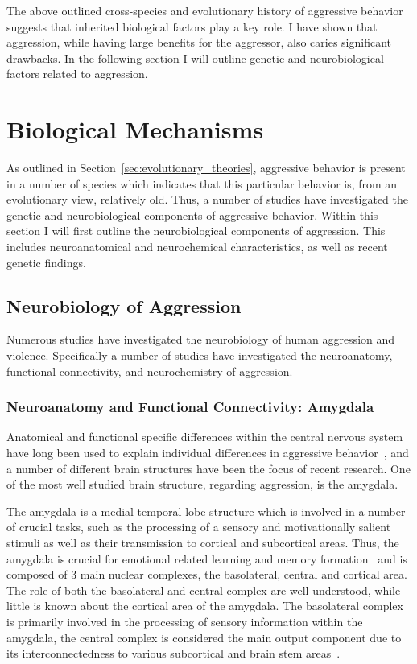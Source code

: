 The above outlined cross-species and evolutionary history of aggressive behavior suggests that inherited biological factors play a key role.
I have shown that aggression, while having large benefits for the aggressor, also caries significant drawbacks.
In the following section I will outline genetic and neurobiological factors related to aggression.

\section{Biological Mechanisms}
\label{sec:biological_mechanisms}

As outlined in Section~\ref{sec:evolutionary_theories}, aggressive behavior is present in a number of species which indicates that this particular behavior is, from an evolutionary view, relatively old.
Thus, a number of studies have investigated the genetic and neurobiological components of aggressive behavior.
Within this section I will first outline the neurobiological components of aggression.
This includes neuroanatomical and neurochemical characteristics, as well as recent genetic findings. 

\subsection{Neurobiology of Aggression}
\label{sub:neurobiology_of_aggression}

Numerous studies have investigated the neurobiology of human aggression and violence.
Specifically a number of studies have investigated the neuroanatomy, functional connectivity, and neurochemistry of aggression. 

\subsubsection{Neuroanatomy and Functional Connectivity: Amygdala}
\label{ssub:neuroanatomy_and_functional_conectivity}

Anatomical and functional specific differences within the central nervous system have long been used to explain individual differences in aggressive behavior~\citet{Rosell2015}, and a number of different brain structures have been the focus of recent research.
One of the most well studied brain structure, regarding aggression, is the amygdala.

The amygdala is a medial temporal lobe structure which is involved in a number of crucial tasks, such as the processing of a sensory and motivationally salient stimuli as well as their transmission to cortical and subcortical areas.
Thus, the amygdala is crucial for emotional related learning and memory formation~\cite{Salzman2010} and is composed of 3 main nuclear complexes, the basolateral, central and cortical area.
The role of both the basolateral and central complex are well understood, while little is known about the cortical area of the amygdala.
The basolateral complex is primarily involved in the processing of sensory information within the amygdala, the central complex is considered the main output component due to its interconnectedness to various subcortical and brain stem areas~\cite{Sah2003}.

